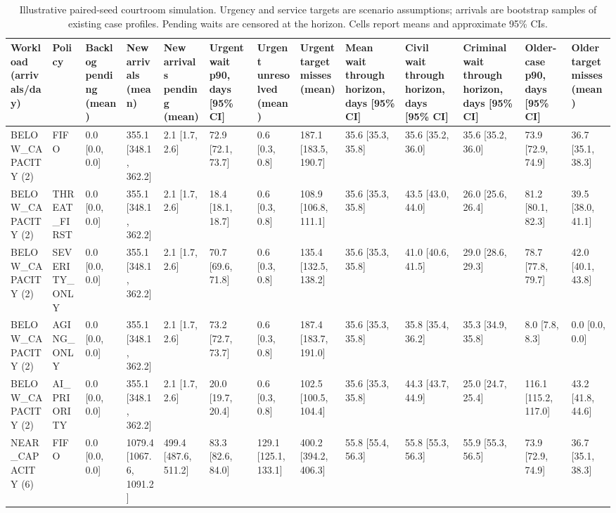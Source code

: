 \begin{table}
\caption{Illustrative paired-seed courtroom simulation. Urgency and service targets are scenario assumptions; arrivals are bootstrap samples of existing case profiles. Pending waits are censored at the horizon. Cells report means and approximate 95\% CIs.}
\label{tab:simulation_results}
\begin{tabular}{lllllllllllll}
\toprule
Workload (arrivals/day) & Policy & Backlog pending (mean) & New arrivals (mean) & New arrivals pending (mean) & Urgent wait p90, days [95\% CI] & Urgent unresolved (mean) & Urgent target misses (mean) & Mean wait through horizon, days [95\% CI] & Civil wait through horizon, days [95\% CI] & Criminal wait through horizon, days [95\% CI] & Older-case p90, days [95\% CI] & Older target misses (mean) \\
\midrule
BELOW\_CAPACITY (2) & FIFO & 0.0 [0.0, 0.0] & 355.1 [348.1, 362.2] & 2.1 [1.7, 2.6] & 72.9 [72.1, 73.7] & 0.6 [0.3, 0.8] & 187.1 [183.5, 190.7] & 35.6 [35.3, 35.8] & 35.6 [35.2, 36.0] & 35.6 [35.2, 36.0] & 73.9 [72.9, 74.9] & 36.7 [35.1, 38.3] \\
BELOW\_CAPACITY (2) & THREAT\_FIRST & 0.0 [0.0, 0.0] & 355.1 [348.1, 362.2] & 2.1 [1.7, 2.6] & 18.4 [18.1, 18.7] & 0.6 [0.3, 0.8] & 108.9 [106.8, 111.1] & 35.6 [35.3, 35.8] & 43.5 [43.0, 44.0] & 26.0 [25.6, 26.4] & 81.2 [80.1, 82.3] & 39.5 [38.0, 41.1] \\
BELOW\_CAPACITY (2) & SEVERITY\_ONLY & 0.0 [0.0, 0.0] & 355.1 [348.1, 362.2] & 2.1 [1.7, 2.6] & 70.7 [69.6, 71.8] & 0.6 [0.3, 0.8] & 135.4 [132.5, 138.2] & 35.6 [35.3, 35.8] & 41.0 [40.6, 41.5] & 29.0 [28.6, 29.3] & 78.7 [77.8, 79.7] & 42.0 [40.1, 43.8] \\
BELOW\_CAPACITY (2) & AGING\_ONLY & 0.0 [0.0, 0.0] & 355.1 [348.1, 362.2] & 2.1 [1.7, 2.6] & 73.2 [72.7, 73.7] & 0.6 [0.3, 0.8] & 187.4 [183.7, 191.0] & 35.6 [35.3, 35.8] & 35.8 [35.4, 36.2] & 35.3 [34.9, 35.8] & 8.0 [7.8, 8.3] & 0.0 [0.0, 0.0] \\
BELOW\_CAPACITY (2) & AI\_PRIORITY & 0.0 [0.0, 0.0] & 355.1 [348.1, 362.2] & 2.1 [1.7, 2.6] & 20.0 [19.7, 20.4] & 0.6 [0.3, 0.8] & 102.5 [100.5, 104.4] & 35.6 [35.3, 35.8] & 44.3 [43.7, 44.9] & 25.0 [24.7, 25.4] & 116.1 [115.2, 117.0] & 43.2 [41.8, 44.6] \\
NEAR\_CAPACITY (6) & FIFO & 0.0 [0.0, 0.0] & 1079.4 [1067.6, 1091.2] & 499.4 [487.6, 511.2] & 83.3 [82.6, 84.0] & 129.1 [125.1, 133.1] & 400.2 [394.2, 406.3] & 55.8 [55.4, 56.3] & 55.8 [55.3, 56.3] & 55.9 [55.3, 56.5] & 73.9 [72.9, 74.9] & 36.7 [35.1, 38.3] \\

\end{tabular}
\end{table}
